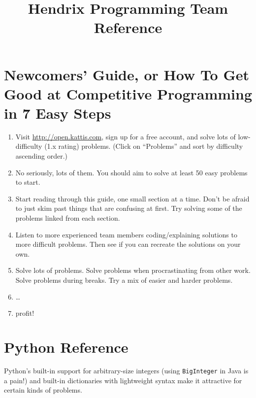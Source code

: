 \documentclass[10pt]{book}
\begin{document}
\title{Hendrix Programming Team Reference}
\maketitle

\tableofcontents
\newpage

\chapter{Newcomers' Guide, or How To Get Good at Competitive Programming in 7 Easy Steps} \label{chap:newcomers}

\begin{enumerate}
\item Visit \url{http://open.kattis.com}, sign up for a free account,
  and solve lots of low-difficulty (1.x rating) problems.  (Click on
  ``Problems'' and sort by difficulty ascending order.)
\item No seriously, lots of them. You should aim to solve at least 50
  easy problems to start.
\item Start reading through this guide, one small section at a time.
  Don't be afraid to just skim past things that are confusing at
  first. Try solving some of the problems linked from each section.
\item Listen to more experienced team members coding/explaining
  solutions to more difficult problems.  Then see if you can recreate
  the solutions on your own.
\item Solve lots of problems.  Solve problems when procrastinating
  from other work.  Solve problems during breaks.  Try a mix of easier
  and harder problems.
\item \dots
\item profit!
\end{enumerate}

\chapter{Python Reference} \label{chap:python}

Python's built-in support for arbitrary-size integers (using
\texttt{BigInteger} in Java is a pain!) and built-in dictionaries with
lightweight syntax make it attractive for certain kinds of problems.
\end{document}
